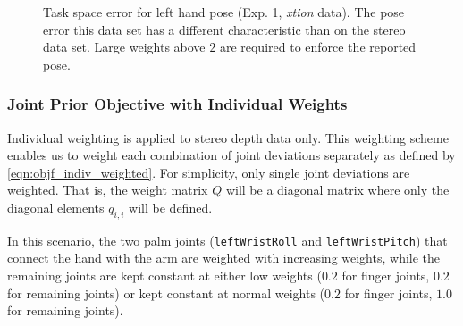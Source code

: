 \begin{figure}[h]
\centering
{}
%
\caption[Task space error (Exp. 1, xtion)]{Task space error for left hand pose (Exp. 1, \textit{xtion} data). The pose error this data set has a different characteristic than on the stereo data set. Large weights above $2$ are required to enforce the reported pose.}
\label{fig:xtion_hand_pose_error}
\end{figure}

\subsubsection{Joint Prior Objective with Individual Weights}

Individual weighting is applied to stereo depth data only. This weighting scheme enables us to weight each combination of joint deviations separately as defined by \cref{eqn:objf_indiv_weighted}. For simplicity, only single joint deviations are weighted. That is, the weight matrix $Q$ will be a diagonal matrix where only the diagonal elements $q_{i,i}$ will be defined.

In this scenario, the two palm joints (\texttt{leftWristRoll} and \texttt{leftWristPitch}) that connect the hand with the arm are weighted with increasing weights, while the remaining joints are kept constant at either low weights ($0.2$ for finger joints, $0.2$ for remaining joints) or kept constant at normal weights ($0.2$ for finger joints, $1.0$ for remaining joints).

